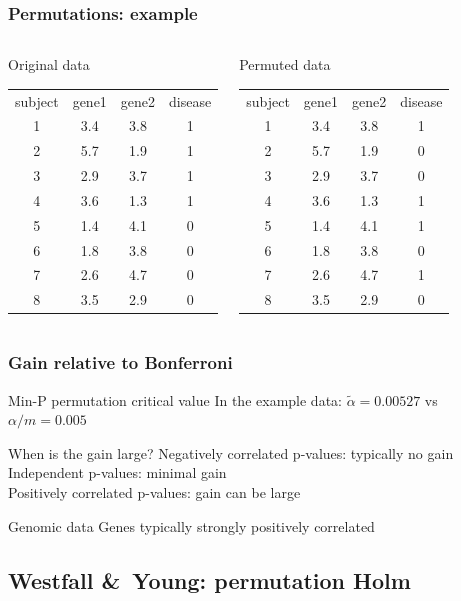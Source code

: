 \documentclass[compress]{beamer}
\newcommand{\bb}[1]{\begin{block}{#1}}
\newcommand{\eb}{\end{block}}
\newcommand{\bfr}[1]{\begin{frame} \frametitle{#1}}
\begin{document}
\bfr{Permutations: example}
  \begin{columns}
    \bb{Original data}
      \begin{tabular}{cccc}
        subject & gene1 & gene2 & disease \\
        1 & 3.4 & 3.8 & 1 \\
        2 & 5.7 & 1.9 & 1 \\
        3 & 2.9 & 3.7 & 1 \\
        4 & 3.6 & 1.3 & 1 \\
        5 & 1.4 & 4.1 & 0 \\
        6 & 1.8 & 3.8 & 0 \\
        7 & 2.6 & 4.7 & 0 \\
        8 & 3.5 & 2.9 & 0
      \end{tabular}
    \eb
    \bb{Permuted data}
      \begin{tabular}{cccc}
        subject & gene1 & gene2 & disease \\
        1 & 3.4 & 3.8 & 1 \\
        2 & 5.7 & 1.9 & 0 \\
        3 & 2.9 & 3.7 & 0 \\
        4 & 3.6 & 1.3 & 1 \\
        5 & 1.4 & 4.1 & 1 \\
        6 & 1.8 & 3.8 & 0 \\
        7 & 2.6 & 4.7 & 1 \\
        8 & 3.5 & 2.9 & 0
      \end{tabular}
    \eb
  \end{columns}
\end{frame}


\bfr{Gain relative to Bonferroni}
  \bb{Min-P permutation critical value}
    In the example data: $\tilde\alpha = 0.00527$ vs $\alpha/m = 0.005$
  \eb
  \bb{When is the gain large?}
    Negatively correlated p-values: typically no gain
    \\Independent p-values: minimal gain
    \\Positively correlated p-values: gain can be large
  \eb
  \bb{Genomic data}
    Genes typically strongly positively correlated
  \eb
\end{frame}


\subsection{Westfall \&\ Young: permutation Holm}
\end{document}
